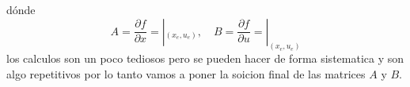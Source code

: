 \documentclass{uofa-eng-assignment}
\begin{document}
dónde 
\[
 A = \frac{\partial f}{\partial x} = |_{(x_e,u_e)}, \quad B = \frac{\partial f}{\partial u} = |_{(x_e,u_e)}
\]
los calculos son un poco tediosos pero se pueden hacer de forma sistematica y son algo repetitivos por lo tanto vamos a 
poner la soicion final de las matrices $A$ y $B$.
\end{document}

